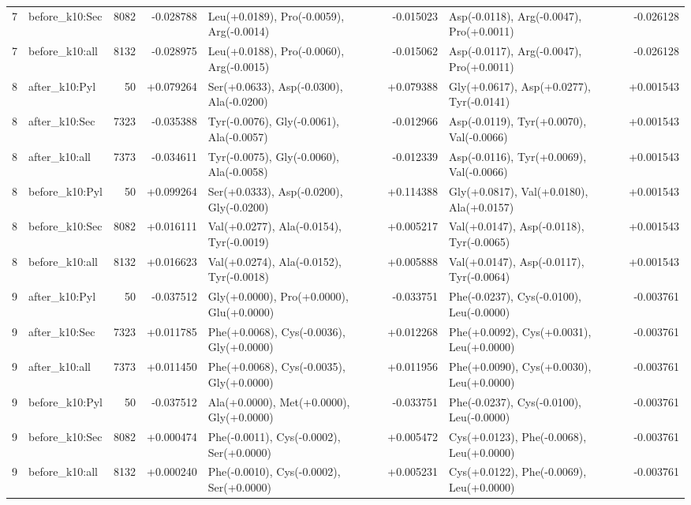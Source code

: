 \begin{longtable}{r >{\raggedright\arraybackslash}p{1.9cm} r r >{\raggedright\arraybackslash}p{3.7cm} r >{\raggedright\arraybackslash}p{3.7cm} r}
7 & before\_\allowbreak{}k10:\allowbreak{}Sec & 8082 & -0.028788 & Leu(+0.0189), Pro(-0.0059), Arg(-0.0014) & -0.015023 & Asp(-0.0118), Arg(-0.0047), Pro(+0.0011) & -0.026128 \\
7 & before\_\allowbreak{}k10:\allowbreak{}all & 8132 & -0.028975 & Leu(+0.0188), Pro(-0.0060), Arg(-0.0015) & -0.015062 & Asp(-0.0117), Arg(-0.0047), Pro(+0.0011) & -0.026128 \\
8 & after\_\allowbreak{}k10:\allowbreak{}Pyl & 50 & +0.079264 & Ser(+0.0633), Asp(-0.0300), Ala(-0.0200) & +0.079388 & Gly(+0.0617), Asp(+0.0277), Tyr(-0.0141) & +0.001543 \\
8 & after\_\allowbreak{}k10:\allowbreak{}Sec & 7323 & -0.035388 & Tyr(-0.0076), Gly(-0.0061), Ala(-0.0057) & -0.012966 & Asp(-0.0119), Tyr(+0.0070), Val(-0.0066) & +0.001543 \\
8 & after\_\allowbreak{}k10:\allowbreak{}all & 7373 & -0.034611 & Tyr(-0.0075), Gly(-0.0060), Ala(-0.0058) & -0.012339 & Asp(-0.0116), Tyr(+0.0069), Val(-0.0066) & +0.001543 \\
8 & before\_\allowbreak{}k10:\allowbreak{}Pyl & 50 & +0.099264 & Ser(+0.0333), Asp(-0.0200), Gly(-0.0200) & +0.114388 & Gly(+0.0817), Val(+0.0180), Ala(+0.0157) & +0.001543 \\
8 & before\_\allowbreak{}k10:\allowbreak{}Sec & 8082 & +0.016111 & Val(+0.0277), Ala(-0.0154), Tyr(-0.0019) & +0.005217 & Val(+0.0147), Asp(-0.0118), Tyr(-0.0065) & +0.001543 \\
8 & before\_\allowbreak{}k10:\allowbreak{}all & 8132 & +0.016623 & Val(+0.0274), Ala(-0.0152), Tyr(-0.0018) & +0.005888 & Val(+0.0147), Asp(-0.0117), Tyr(-0.0064) & +0.001543 \\
9 & after\_\allowbreak{}k10:\allowbreak{}Pyl & 50 & -0.037512 & Gly(+0.0000), Pro(+0.0000), Glu(+0.0000) & -0.033751 & Phe(-0.0237), Cys(-0.0100), Leu(-0.0000) & -0.003761 \\
9 & after\_\allowbreak{}k10:\allowbreak{}Sec & 7323 & +0.011785 & Phe(+0.0068), Cys(-0.0036), Gly(+0.0000) & +0.012268 & Phe(+0.0092), Cys(+0.0031), Leu(+0.0000) & -0.003761 \\
9 & after\_\allowbreak{}k10:\allowbreak{}all & 7373 & +0.011450 & Phe(+0.0068), Cys(-0.0035), Gly(+0.0000) & +0.011956 & Phe(+0.0090), Cys(+0.0030), Leu(+0.0000) & -0.003761 \\
9 & before\_\allowbreak{}k10:\allowbreak{}Pyl & 50 & -0.037512 & Ala(+0.0000), Met(+0.0000), Gly(+0.0000) & -0.033751 & Phe(-0.0237), Cys(-0.0100), Leu(-0.0000) & -0.003761 \\
9 & before\_\allowbreak{}k10:\allowbreak{}Sec & 8082 & +0.000474 & Phe(-0.0011), Cys(-0.0002), Ser(+0.0000) & +0.005472 & Cys(+0.0123), Phe(-0.0068), Leu(+0.0000) & -0.003761 \\
9 & before\_\allowbreak{}k10:\allowbreak{}all & 8132 & +0.000240 & Phe(-0.0010), Cys(-0.0002), Ser(+0.0000) & +0.005231 & Cys(+0.0122), Phe(-0.0069), Leu(+0.0000) & -0.003761 \\
\bottomrule
\end{longtable}
\endgroup

